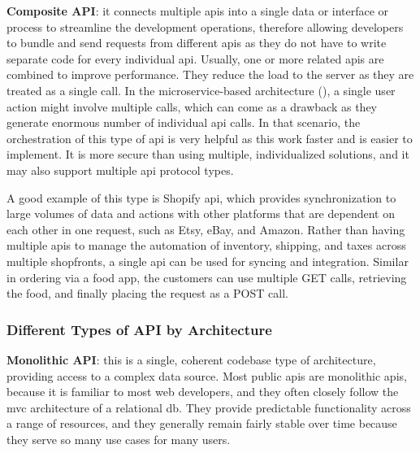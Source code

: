 % 
% 
\textbf{Composite API}: it connects multiple \acrshort{api}s into a single data or interface or process to
streamline the development operations, therefore allowing developers to bundle and send requests from different
\acrshort{api}s as they do not have to write separate code for every individual \acrshort{api}. Usually,
one or more related \acrshort{api}s are combined to improve performance. They reduce the load to the server
as they are treated as a single call. In the microservice-based architecture
(\textit{}), a single user action might involve multiple calls, which can come as
a drawback as they generate enormous number of individual \acrshort{api} calls. In that scenario, the orchestration
of this type of \acrshort{api} is very helpful as this work faster and is easier to implement. It is more secure
than using multiple, individualized solutions, and it may also support multiple \acrshort{api} protocol types.

A good example of this type is Shopify \acrshort{api}, which provides synchronization to large volumes of data and
actions with other platforms that are dependent on each other in one request, such as Etsy, eBay, and Amazon. Rather
than having multiple \acrshort{api}s to manage the automation of inventory, shipping, and taxes across multiple shopfronts,
a single \acrshort{api} can be used for syncing and integration. Similar in ordering via a food app, the customers can
use multiple GET calls, retrieving the food, and finally placing the request as a POST call.
\subsubsection{Different Types of API by Architecture}
\textbf{Monolithic API}: this is a single, coherent codebase type of architecture, providing access to a complex data
source. Most public \acrshort{api}s are monolithic \acrshort{api}s, because it is familiar to most web developers, and
they often closely follow the \acrshort{mvc} architecture of a relational \acrshort{db}. They provide predictable
functionality across a range of resources, and they generally remain fairly stable over time because they serve so
many use cases for many users.

